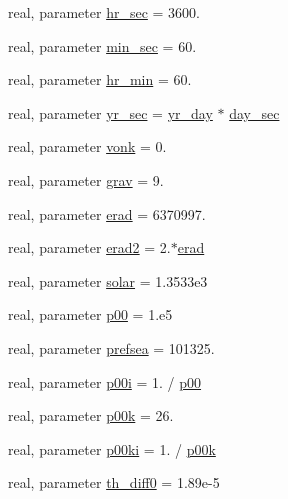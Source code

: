 \begin{DoxyCompactItemize}
real, parameter \hyperlink{namespaceconsts__coms_acae5e7f232dc6e70cfdeaf44d9263406}{hr\+\_\+sec} = 3600.
\item 
real, parameter \hyperlink{namespaceconsts__coms_a34e3f5c2fd6493a836a9797220b50639}{min\+\_\+sec} = 60.
\item 
real, parameter \hyperlink{namespaceconsts__coms_a1ade40f36e0ba6beb80054d5963b2b23}{hr\+\_\+min} = 60.
\item 
real, parameter \hyperlink{namespaceconsts__coms_ae3a6000a33c9aa556d49b173b86f3b49}{yr\+\_\+sec} = \hyperlink{namespaceconsts__coms_adad953349aafb445de8a82640081a357}{yr\+\_\+day} $\ast$ \hyperlink{namespaceconsts__coms_a3ff38434ac06e17e92b1929696b56611}{day\+\_\+sec}
\item 
real, parameter \hyperlink{namespaceconsts__coms_ad66b0d002b8c2531bde3625010d94eac}{vonk} = 0.
\item 
real, parameter \hyperlink{namespaceconsts__coms_ac1aae6e7087ffc22025cd1527c705e3e}{grav} = 9.
\item 
real, parameter \hyperlink{namespaceconsts__coms_a359b412a0b4b216f6f33e18264e25f1d}{erad} = 6370997.
\item 
real, parameter \hyperlink{namespaceconsts__coms_a81a49e39b11ce112f102ddd3dd2c4270}{erad2} = 2.$\ast$\hyperlink{namespaceconsts__coms_a359b412a0b4b216f6f33e18264e25f1d}{erad}
\item 
real, parameter \hyperlink{namespaceconsts__coms_a0f6603824548cc6136bef94ed0686ba1}{solar} = 1.\+3533e3
\item 
real, parameter \hyperlink{namespaceconsts__coms_a2e56fe1bdb69a647d3bdfd214a331e4a}{p00} = 1.e5
\item 
real, parameter \hyperlink{namespaceconsts__coms_af9c954288aafec990d48d4e1d52a3754}{prefsea} = 101325.
\item 
real, parameter \hyperlink{namespaceconsts__coms_aeaba287fa2285b85b6739b70bb76f165}{p00i} = 1. / \hyperlink{namespaceconsts__coms_a2e56fe1bdb69a647d3bdfd214a331e4a}{p00}
\item 
real, parameter \hyperlink{namespaceconsts__coms_ac33b326d1376f1dc4b743c9b7fef5cac}{p00k} = 26.
\item 
real, parameter \hyperlink{namespaceconsts__coms_a0bae1605acd44e8d9b1719c378b95acc}{p00ki} = 1. / \hyperlink{namespaceconsts__coms_ac33b326d1376f1dc4b743c9b7fef5cac}{p00k}
\item 
real, parameter \hyperlink{namespaceconsts__coms_a46eedb2769a2f899670b7245a8af4fa5}{th\+\_\+diff0} = 1.\+89e-\/5
\item 

\end{DoxyCompactItemize}
